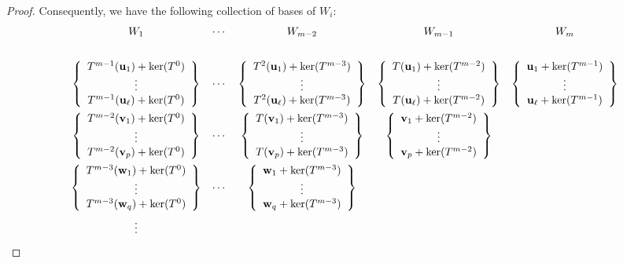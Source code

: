 \begin{proof}
Consequently, we have the following collection of bases of $W_i$:
{\small\[
\begin{array}{cccccc}
    W_1 & \cdots &
    W_{m-2} &
    W_{m-1}&
    W_{m}
\\[2em]
\left\{
    \begin{array}{c}
        T^{m-1}({\bf u}_1) + \ker(T^0) \\
        \vdots \\
        T^{m-1}({\bf u}_{\ell}) + \ker(T^0)
    \end{array}
\right\}
& \cdots &
\left\{
    \begin{array}{c}
        T^2({\bf u}_1) + \ker(T^{m-3}) \\
        \vdots \\
        T^2({\bf u}_{\ell}) + \ker(T^{m-3})
    \end{array}
\right\}
& 
\left\{
    \begin{array}{c}
        T({\bf u}_1) + \ker(T^{m-2}) \\
        \vdots \\
        T({\bf u}_{\ell}) + \ker(T^{m-2})
    \end{array}
\right\}
& 
\left\{
    \begin{array}{c}
        {\bf u}_1 + \ker(T^{m-1}) \\
        \vdots \\
        {\bf u}_{\ell} + \ker(T^{m-1})
    \end{array}
\right\}
\\[2em]
\left\{
    \begin{array}{c}
        T^{m-2}({\bf v}_1) + \ker(T^0) \\
        \vdots \\
        T^{m-2}({\bf v}_p) + \ker(T^0)
    \end{array}
\right\}
& \cdots &
\left\{
    \begin{array}{c}
        T({\bf v}_1) + \ker(T^{m-3}) \\
        \vdots \\
        T({\bf v}_p) + \ker(T^{m-3})
    \end{array}
\right\}
& 
\left\{
    \begin{array}{c}
        {\bf v}_1 + \ker(T^{m-2}) \\
        \vdots \\
        {\bf v}_p + \ker(T^{m-2})
    \end{array}
\right\}
& 
\\[2em]
\left\{
    \begin{array}{c}
        T^{m-3}({\bf w}_1) + \ker(T^0) \\
        \vdots \\
        T^{m-3}({\bf w}_q) + \ker(T^0)
    \end{array}
\right\}
& \cdots &
\left\{
    \begin{array}{c}
        {\bf w}_1 + \ker(T^{m-3}) \\
        \vdots \\
        {\bf w}_q + \ker(T^{m-3})
    \end{array}
\right\}
& & 
\\[2em]
\vdots & & & &
\end{array}
\]}


\end{proof}
